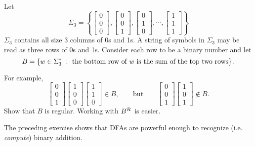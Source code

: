 \documentclass[twoside,letterpaper,openany]{book}
\begin{document}
\begin{exer2}
Let
\[
\Sigma_3 = \left\{ \left[\begin{array}{c}0\\0\\0\end{array}\right],
			   \left[\begin{array}{c}0\\0\\1\end{array}\right],
			  \left[\begin{array}{c}0\\1\\0\end{array}\right],
		          \cdots,
		          \left[\begin{array}{c}1\\1\\1\end{array}\right]
		  \right\}
\]
$\Sigma_3$ contains all size 3 columns of 0s and 1s. A string of symbols in $\Sigma_3$ may be read as three rows of 0s and 1s. Consider each row to be a binary number and let
\[
B = \left\lbrace w\in\Sigma_3^{*}\ :\ \textrm{the bottom row of $w$ is the sum of the top two rows} \right\rbrace.
\]

For example,
\[
\left[\begin{array}{c}0\\0\\1\end{array}\right]
\left[\begin{array}{c}1\\0\\0\end{array}\right]
\left[\begin{array}{c}1\\1\\0\end{array}\right]
\in B, \quad \quad \textrm{but} \quad \quad
\left[\begin{array}{c}0\\0\\1\end{array}\right]
\left[\begin{array}{c}1\\0\\1\end{array}\right]
\notin B.
\]
Show that $B$ is regular. 
\hint Working with $B^{\mathcal{R}}$ is easier.
\end{exer2}

\begin{discussion}
The preceding exercise shows that DFAs are powerful enough to recognize (i.e. \emph{compute}) binary addition.
\end{discussion}
\end{document}

